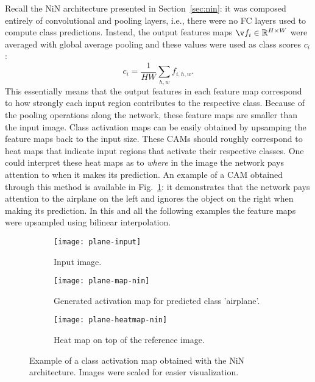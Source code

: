 Recall the NiN architecture presented in Section~\ref{sec:nin}: it was composed entirely of convolutional and pooling layers, i.e., there were no FC layers used to compute class predictions. Instead, the output features maps $\v f_i \in \mathbb{R}^{H\times W}$ were averaged with global average pooling and these values were used as class scores $c_i$:
\begin{equation}
c_i = \frac{1}{HW}\sum_{h,w}f_{i, h, w}.
\end{equation}
This essentially means that the output features in each feature map correspond to how strongly each input region contributes to the respective class. Because of the pooling operations along the network, these feature maps are smaller than the input image. Class activation maps can be easily obtained by upsamping the feature maps back to the input size. These CAMs should roughly correspond to heat maps that indicate input regions that activate their respective classes. One could interpret these heat maps as to \textit{where} in the image the network pays attention to when it makes its prediction. An example of a CAM obtained through this method is available in Fig.~\ref{fig:cam-plane-nin}: it demonstrates that the network pays attention to the airplane on the left and ignores the object on the right when making its prediction. In this and all the following examples the feature maps were upsampled using bilinear interpolation.

\begin{figure}
	\centering
	\begin{subfigure}[t]{0.3\textwidth}
		\texttt{[image: plane-input]}
		\caption{Input image.}
	\end{subfigure}\quad
	\begin{subfigure}[t]{0.3\textwidth}
		\texttt{[image: plane-map-nin]}
		\caption{Generated activation map for predicted class 'airplane'.}
	\end{subfigure}\quad
	\begin{subfigure}[t]{0.3\textwidth}
		\texttt{[image: plane-heatmap-nin]}
		\caption{Heat map on top of the reference image.}
	\end{subfigure}
	\caption{Example of a class activation map obtained with the NiN architecture. Images were scaled for easier visualization.\label{fig:cam-plane-nin}}
\end{figure}

